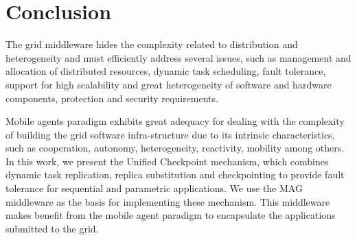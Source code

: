 \documentclass[times, 09pt, twocolumn]{article}
\begin{document}
%
%
%
% 
%
%
%
%

\section{Conclusion}

The grid middleware hides the complexity related to distribution and
heterogeneity and must efficiently address several issues, such as management
and allocation of distributed resources, dynamic task scheduling, fault
tolerance, support for high scalability and great heterogeneity of software and
hardware components, protection and security requirements. 

Mobile agents paradigm exhibits great adequacy for dealing with the complexity
of building the grid software infra-structure due to its intrinsic
characteristics, such as cooperation, autonomy, heterogeneity, reactivity,
mobility among others. In this work, we present the Unified Checkpoint
mechanism, which combines dynamic task replication, replica substitution and
checkpointing to provide fault tolerance for sequential and parametric
applications. We use the MAG middleware as the basis for implementing these
mechanism. This middleware makes benefit from the mobile agent paradigm to
encapsulate the applications submitted to the grid. 
\end{document}
